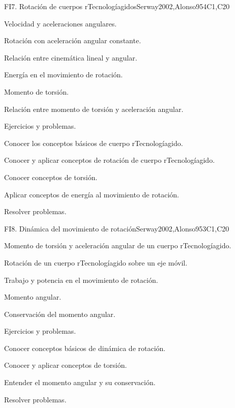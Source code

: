 \begin{syllabus}
\begin{unit}{FI7. Rotación de cuerpos rTecnologíagidos}{}{Serway2002,Alonso95}{4}{C1,C20}
\begin{topics}
      \item Velocidad y aceleraciones angulares.
      \item Rotación con aceleración angular constante.
      \item Relación entre cinemática lineal y angular.
      \item Energía en el movimiento de rotación.
      \item Momento de torsión.
      \item Relación entre momento de torsión y aceleración angular.
      \item Ejercicios y problemas.
   \end{topics}

   \begin{learningoutcomes}
      \item Conocer los conceptos básicos de cuerpo rTecnologíagido.
      \item Conocer y aplicar conceptos de rotación de cuerpo rTecnologíagido.
      \item Conocer conceptos de torsión.
      \item Aplicar conceptos de energía al movimiento de rotación.
      \item Resolver problemas.
   \end{learningoutcomes}
\end{unit}

\begin{unit}{FI8. Dinámica del movimiento de rotación}{}{Serway2002,Alonso95}{3}{C1,C20}
\begin{topics}
      \item Momento de torsión y aceleración angular de un cuerpo rTecnologíagido.
      \item Rotación de un cuerpo rTecnologíagido sobre un eje móvil.
      \item Trabajo y potencia en el movimiento de rotación.
      \item Momento angular.
      \item Conservación del momento angular.
      \item Ejercicios y problemas.
    \end{topics}

   \begin{learningoutcomes}
      \item Conocer conceptos básicos de dinámica de rotación.
      \item Conocer y aplicar conceptos de torsión.
      \item Entender el momento angular y su conservación.
      \item Resolver problemas.
   \end{learningoutcomes}
\end{unit}

\begin{coursebibliography}
\end{coursebibliography}
\end{syllabus}
